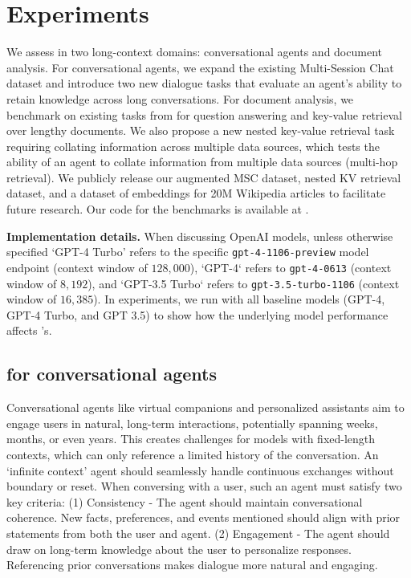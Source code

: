 \section{Experiments}
\label{sec:eval}

We assess \ours in two long-context domains: conversational agents and document analysis. For conversational agents, we expand the existing Multi-Session Chat dataset \cite{xu2021mscbeyond} and introduce two new dialogue tasks that evaluate an agent's ability to retain knowledge across long conversations. For document analysis, we benchmark \ours on existing tasks from \cite{liu2023lostinmiddle} for question answering and key-value retrieval over lengthy documents. We also propose a new nested key-value retrieval task requiring collating information across multiple data sources, which tests the ability of an agent to collate information from multiple data sources (multi-hop retrieval). We publicly release our augmented MSC dataset, nested KV retrieval dataset, and a dataset of embeddings for 20M Wikipedia articles to facilitate future research. Our code for the benchmarks is available at \website. 

\textbf{Implementation details.} When discussing OpenAI models, unless otherwise specified `GPT-4 Turbo' refers to the specific \texttt{gpt-4-1106-preview} model endpoint (context window of $128,000$), `GPT-4` refers to \texttt{gpt-4-0613} (context window of $8,192$), and `GPT-3.5 Turbo` refers to \texttt{gpt-3.5-turbo-1106} (context window of $16,385$). In experiments, we run \ours with all baseline models (GPT-4, GPT-4 Turbo, and GPT 3.5) to show how the underlying model performance affects \ours's. 






\subsection{\ours for conversational agents}

Conversational agents like virtual companions and personalized assistants aim to engage users in natural, long-term interactions, potentially spanning weeks, months, or even years. This creates challenges for models with fixed-length contexts, which can only reference a limited history of the conversation. An `infinite context' agent should seamlessly handle continuous exchanges without boundary or reset. When conversing with a user, such an agent must satisfy two key criteria:
(1) Consistency - The agent should maintain conversational coherence. New facts, preferences, and events mentioned should align with prior statements from both the user and agent.
(2) Engagement - The agent should draw on long-term knowledge about the user to personalize responses. Referencing prior conversations makes dialogue more natural and engaging.

